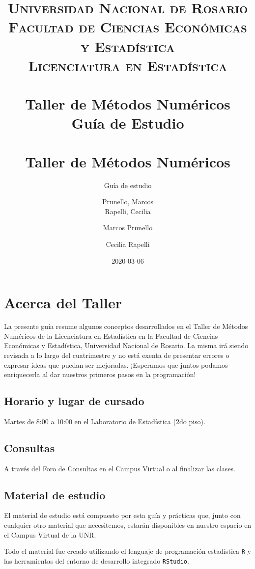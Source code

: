 \documentclass[]{book}
\title{
	\usefont{OT1}{bch}{b}{n}
	\normalfont \normalsize
	\textsc{
		Universidad Nacional de Rosario \\
		Facultad de Ciencias Económicas y Estadística \\
		Licenciatura en Estadística
	} \\ [25pt]
	\horrule{2pt} \\[0.4cm]
	\huge \textbf{Taller de Métodos Numéricos} \\
	\bigbreak
	Guía de Estudio\\
	\horrule{2pt} \\[0.5cm]}
\author{
	\normalfont Prunello, Marcos \\
	\normalfont Rapelli, Cecilia
}
\title{Taller de Métodos Numéricos}
\subtitle{Guía de estudio}
\author{Marcos Prunello \and Cecilia Rapelli}
\date{2020-03-06}
\begin{document}
\maketitle

{
\setcounter{tocdepth}{1}
\tableofcontents
}
\hypertarget{acerca-del-taller}{%
\chapter*{Acerca del Taller}\label{acerca-del-taller}}

La presente guía resume algunos conceptos desarrollados en el Taller de Métodos Numéricos de la Licenciatura en Estadística en la Facultad de Ciencias Económicas y Estadística, Universidad Nacional de Rosario. La misma irá siendo revisada a lo largo del cuatrimestre y no está exenta de presentar errores o expresar ideas que puedan ser mejoradas. ¡Esperamos que juntos podamos enriquecerla al dar nuestros primeros pasos en la programación!

\hypertarget{horario-y-lugar-de-cursado}{%
\section*{Horario y lugar de cursado}\label{horario-y-lugar-de-cursado}}

Martes de 8:00 a 10:00 en el Laboratorio de Estadística (2do piso).

\hypertarget{consultas}{%
\section*{Consultas}\label{consultas}}

A través del Foro de Consultas en el Campus Virtual o al finalizar las clases.

\hypertarget{material-de-estudio}{%
\section*{Material de estudio}\label{material-de-estudio}}

El material de estudio está compuesto por esta guía y prácticas que, junto con cualquier otro material que necesitemos, estarán disponibles en nuestro espacio en el Campus Virtual de la UNR.

Todo el material fue creado utilizando el lenguaje de programación estadística \texttt{R} y las herramientas del entorno de desarrollo integrado \texttt{RStudio}.
\end{document}
